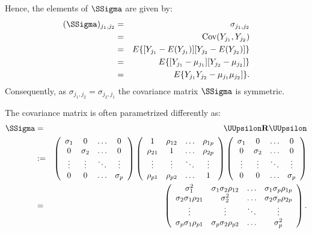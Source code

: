 \documentclass[a4paper]{article}
\theoremstyle{myexamplestyle}
\begin{document}
Hence, the elements of $\SSigma$ are given by:
\begin{eqnarray*}
( \SSigma )_{j_1, j_2} & = & \sigma_{j_1, j_2}
\\
& = & \mbox{Cov}(Y_{j_1}, Y_{j_2})
\\
& = & E\{ [ Y_{j_1} - E (Y_{j_1})] [ Y_{j_2} - E (Y_{j_2})] \}
\\
& = & E\{ [ Y_{j_1} - \mu_{j_1}] [ Y_{j_2} - \mu_{j_2}] \}
\\
& = & E\{  Y_{j_1} Y_{j_2} - \mu_{j_1} \mu_{j_2}] \}.
\end{eqnarray*}
Consequently, as $\sigma_{j_1, j_2} = \sigma_{j_2, j_1}$ the covariance matrix $\SSigma$ is symmetric.


The covariance matrix is often parametrized differently as:
\begin{eqnarray*}
\SSigma & = & \UUpsilon \mathbf{R} \UUpsilon
\\
& := &
\left(
\begin{array}{cccc}
\sigma_{1} & 0 & \ldots & 0
\\
0 & \sigma_{2} & \ldots & 0
\\
\vdots & \vdots & \ddots & \vdots
\\
0 & 0 & \ldots & \sigma_{p}
\end{array}
\right)
\left(
\begin{array}{cccc}
1 & \rho_{12} & \ldots & \rho_{1p}
\\
\rho_{21} & 1 & \ldots & \rho_{2p}
\\
\vdots & \vdots & \ddots & \vdots
\\
\rho_{p1} & \rho_{p2} & \ldots & 1
\end{array}
\right)
\left(
\begin{array}{cccc}
\sigma_{1} & 0 & \ldots & 0
\\
0 & \sigma_{2} & \ldots & 0
\\
\vdots & \vdots & \ddots & \vdots
\\
0 & 0 & \ldots & \sigma_{p}
\end{array}
\right)
\\
& = & \left(
\begin{array}{cccc}
\sigma_{1}^2 & \sigma_{1} \sigma_{2} \rho_{12} & \ldots & \sigma_{1} \sigma_{p} \rho_{1p}
\\
\sigma_{2} \sigma_{1} \rho_{21} & \sigma_{2}^2 & \ldots & \sigma_{2} \sigma_{p} \rho_{2p}
\\
\vdots & \vdots & \ddots & \vdots
\\
\sigma_{p} \sigma_{1} \rho_{p1} & \sigma_{p} \sigma_{2} \rho_{p2} & \ldots & \sigma_{p}^2
\end{array}
\right).
\end{eqnarray*}
\end{document}
